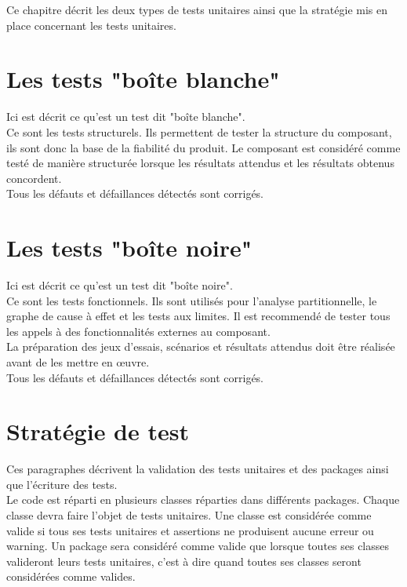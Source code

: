 
Ce chapitre décrit les deux types de tests unitaires ainsi que la stratégie mis en place concernant les tests unitaires.

\section{Les tests "boîte blanche"}
	Ici est décrit ce qu'est un test dit "boîte blanche". \\	
		
	Ce sont les tests structurels. Ils permettent de tester la structure du composant, ils sont donc la base de la fiabilité du produit. Le composant est considéré comme testé de manière structurée lorsque les résultats attendus et les résultats obtenus concordent. \\
	
	Tous les défauts et défaillances détectés sont corrigés.
	
\section{Les tests "boîte noire"}
	Ici est décrit ce qu'est un test dit "boîte noire". \\	
		
	Ce sont les tests fonctionnels. Ils sont utilisés pour l’analyse partitionnelle, le graphe de cause à effet et les tests aux limites. Il est recommendé de tester tous les appels à des fonctionnalités externes au composant. \\
	
	La préparation des jeux d’essais, scénarios et résultats attendus doit être réalisée avant de les mettre en œuvre. \\
	
	Tous les défauts et défaillances détectés sont corrigés.
	
	
\section{Stratégie de test}
	Ces paragraphes décrivent la validation des tests unitaires et des packages ainsi que l'écriture des tests. \\
		
	Le code est réparti en plusieurs classes réparties dans différents packages. Chaque classe devra faire l'objet de tests unitaires. Une classe est considérée comme valide si tous ses tests unitaires et assertions ne produisent aucune erreur ou warning. Un package sera considéré comme valide que lorsque toutes ses classes valideront leurs tests unitaires, c'est à dire quand toutes ses classes seront considérées comme valides. \\
	
